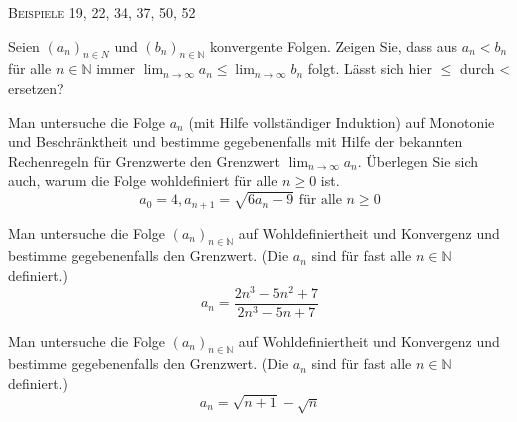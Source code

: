 \documentclass[a4paper, 12pt, margins=3cm]{homework}
\newcommand{\N}{\mathbb{N}}
\begin{document}
  \begin{center}
    \textsc{Beispiele 19, 22, 34, 37, 50, 52}
  \end{center}

  \begin{problem}
    Seien $(a_n)_{n\in N}$ und $(b_n)_{n\in \N}$ konvergente Folgen. Zeigen Sie,
    dass aus $a_n<b_n$ für alle $n\in \N$ immer $\lim_{n\rightarrow\infty}a_n \leq \lim_{n\rightarrow\infty}b_n$
    folgt. Lässt sich hier $\leq$ durch < ersetzen?
  \end{problem}
  \begin{solution}
    
  \end{solution}

  \begin{problem}
    Man untersuche die Folge $a_n$ (mit Hilfe vollständiger Induktion) auf Monotonie
    und Beschränktheit und bestimme gegebenenfalls mit Hilfe der bekannten Rechenregeln
    für Grenzwerte den Grenzwert $\lim_{n\rightarrow\infty}a_n$. Überlegen Sie sich
    auch, warum die Folge wohldefiniert für alle $n \geq 0$ ist.
    \[ a_0 = 4, a_{n+1} = \sqrt{6a_n-9} \text{ für alle } n\geq 0 \]
  \end{problem}
  \begin{solution}
    
  \end{solution}

  \begin{problem}
    Man untersuche die Folge $(a_n)_{n\in \N}$ auf Wohldefiniertheit und Konvergenz
    und bestimme gegebenenfalls den Grenzwert. (Die $a_n$ sind für fast alle $n\in \N$ definiert.)
    \[ a_n = \frac{2n^3-5n^2+7}{2n^3-5n+7} \]
  \end{problem}
  \begin{solution}
    
  \end{solution}

  \begin{problem}
    Man untersuche die Folge $(a_n)_{n\in \N}$ auf Wohldefiniertheit und Konvergenz
    und bestimme gegebenenfalls den Grenzwert. (Die $a_n$ sind für fast alle $n\in \N$ definiert.)
    \[ a_n = \sqrt{n+1} - \sqrt{n} \]
  \end{problem}
  \begin{solution}
    
  \end{solution}
\end{document}
